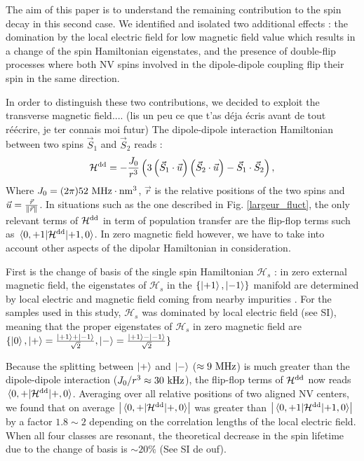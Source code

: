 \documentclass[preprintnumbers,amsmath,amssymb,superscriptaddress,twocolumn,showpacs]{revtex4-2}
\begin{document}
The aim of this paper is to understand the remaining contribution to the spin decay in this second case. We identified and isolated two additional effects : the domination by the local electric field for low magnetic field value which results in a change of the spin Hamiltonian eigenstates, and the presence of double-flip processes where both NV spins involved in the dipole-dipole coupling flip their spin in the same direction.

In order to distinguish these two contributions, we decided to exploit the transverse magnetic field.... (lis un peu ce que t'as déja écris avant de tout réécrire, je ter connais moi futur)
The dipole-dipole interaction Hamiltonian between two spins ${\vec S}_1$ and ${\vec S}_2$ reads :
\begin{equation}
\mathcal{H}^{\rm dd}= -\frac{J_0}{r^3}\left(3\left({\vec S}_1 \cdot \vec u \right)\left({\vec S}_2 \cdot \vec u \right) - {\vec S}_1 \cdot {\vec S}_2  \right),
\end{equation}
Where $J_0= (2 \pi) 52\ \rm MHz \cdot \rm{nm}^3$, $\vec r$ is the relative positions of the two spins and $\vec u = \frac{\vec r}{\norm{\vec r}}$. In situations such as the one described in Fig. \ref{largeur_fluct}, the only relevant terms of $\mathcal{H}^{\rm dd}$ in term of population transfer are the flip-flop terms such as $\mel{0,+1}{\mathcal{H}^{\rm dd}}{+1,0}$. In zero magnetic field however, we have to take into account other aspects of the dipolar Hamiltonian in consideration.

First is the change of basis of the single spin Hamiltonian $\mathcal{H}_s$ : in zero external magnetic field, the eigenstates of $\mathcal{H}_s$ in the $\{\ket{+1},\ket{-1}\}$ manifold are determined by local electric and magnetic field coming from nearby impurities \cite{mittiga2018imaging}. For the samples used in this study, $\mathcal{H}_s$ was dominated by local electric field (see SI), meaning that the proper eigenstates of $\mathcal{H}_s$ in zero magnetic field are $\{ \ket{0},\ket{+}=\frac{\ket{+1}+\ket{-1}}{\sqrt{2}},\ket{-}=\frac{\ket{+1}-\ket{-1}}{\sqrt{2}} \} $

Because the splitting between $\ket{+}$ and $\ket{-}$ ($\approx 9\ \rm MHz$) is much greater than the dipole-dipole interaction ($J_0 / r^3 \approx 30\ \rm kHz$), the flip-flop terms of $\mathcal{H}^{\rm dd}$ now reads $\mel{0,+}{\mathcal{H}^{\rm dd}}{+,0}$. Averaging over all relative positions of two aligned NV centers, we found that on average $\abs{\mel{0,+}{\mathcal{H}^{\rm dd}}{+,0}}$ was greater than 
$\abs{\mel{0,+1}{\mathcal{H}^{\rm dd}}{+1,0}}$ by a factor $1.8 \sim 2$ depending on the correlation lengths of the local electric field.
When all four classes are resonant, the theoretical decrease in the spin lifetime due to the change of basis is $\sim 20 \%$ (See SI de ouf).
\end{document}

